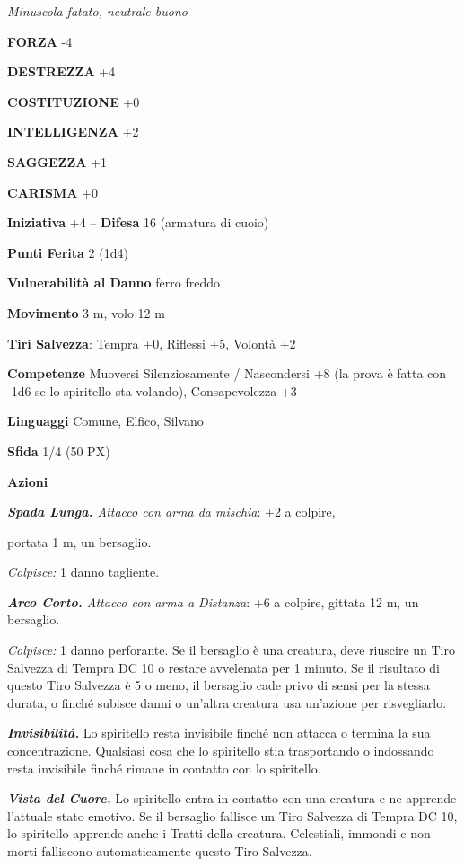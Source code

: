 \begin{multicols}{2}
	\textit{Minuscola fatato, neutrale buono}

	\textbf{FORZA} -4

	\textbf{DESTREZZA} +4

	\textbf{COSTITUZIONE} +0

	\textbf{INTELLIGENZA} +2

	\textbf{SAGGEZZA} +1

	\textbf{CARISMA} +0

	\textbf{Iniziativa} +4 -- \textbf{Difesa} 16 (armatura di cuoio)

	\textbf{Punti Ferita} 2 (1d4)

	\textbf{Vulnerabilità al Danno} ferro freddo

	\textbf{Movimento} 3 m, volo 12 m

	\textbf{Tiri Salvezza}: Tempra +0, Riflessi +5, Volontà +2

	\textbf{Competenze} Muoversi Silenziosamente / Nascondersi +8 (la prova è fatta con -1d6 se lo spiritello sta volando), Consapevolezza +3

	\textbf{Linguaggi} Comune, Elfico, Silvano

	\textbf{Sfida} 1/4 (50 PX)

	\textbf{Azioni}

	\textit{\textbf{Spada Lunga.} Attacco con arma da mischia}: +2 a colpire,

	portata 1 m, un bersaglio.

	\textit{Colpisce:} 1 danno tagliente.

	\textit{\textbf{Arco Corto.} Attacco con arma a Distanza}: +6 a colpire, gittata 12 m, un bersaglio.

	\textit{Colpisce:} 1 danno perforante. Se il bersaglio è una creatura, deve riuscire un Tiro Salvezza di Tempra DC 10 o restare avvelenata per 1 minuto. Se il risultato di questo Tiro Salvezza è 5 o meno, il bersaglio cade privo di sensi per la stessa durata, o finché subisce danni o un'altra creatura usa un'azione per risvegliarlo.

	\textit{\textbf{Invisibilità.}} Lo spiritello resta invisibile finché non attacca o termina la sua concentrazione. Qualsiasi cosa che lo spiritello stia trasportando o indossando resta invisibile finché rimane in contatto con lo spiritello.

	\textit{\textbf{Vista del Cuore.}} Lo spiritello entra in contatto con una creatura e ne apprende l'attuale stato emotivo. Se il bersaglio fallisce un Tiro Salvezza di Tempra DC 10, lo spiritello apprende anche i Tratti della creatura. Celestiali, immondi e non morti falliscono automaticamente questo Tiro Salvezza.


\end{multicols}
